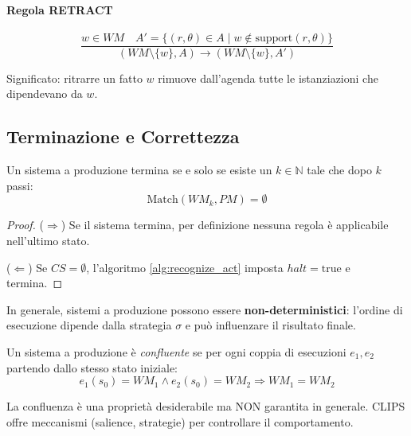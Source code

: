 \paragraph{Regola RETRACT}

\begin{equation}
\frac{
  w \in WM \quad A' = \{(r, \theta) \in A \mid w \notin \text{support}(r, \theta)\}
}{
  (WM \setminus \{w\}, A) \to (WM \setminus \{w\}, A')
}
\end{equation}

Significato: ritrarre un fatto $w$ rimuove dall'agenda tutte le istanziazioni che dipendevano da $w$.

\subsection{Terminazione e Correttezza}

\begin{teorema}[Terminazione]
Un sistema a produzione termina se e solo se esiste un $k \in \mathbb{N}$ tale che dopo $k$ passi:
\begin{equation}
\text{Match}(WM_k, PM) = \emptyset
\end{equation}
\end{teorema}

\begin{proof}
($\Rightarrow$) Se il sistema termina, per definizione nessuna regola è applicabile nell'ultimo stato.

($\Leftarrow$) Se $CS = \emptyset$, l'algoritmo \ref{alg:recognize_act} imposta $halt = \text{true}$ e termina.
\end{proof}

\begin{warningbox}
In generale, sistemi a produzione possono essere \textbf{non-deterministici}: l'ordine di esecuzione dipende dalla strategia $\sigma$ e può influenzare il risultato finale.
\end{warningbox}

\begin{teorema}[Confluenza]
Un sistema a produzione è \textit{confluente} se per ogni coppia di esecuzioni $e_1, e_2$ partendo dallo stesso stato iniziale:
\begin{equation}
e_1(s_0) = WM_1 \land e_2(s_0) = WM_2 \Rightarrow WM_1 = WM_2
\end{equation}
\end{teorema}

\begin{osservazione}
La confluenza è una proprietà desiderabile ma NON garantita in generale. CLIPS offre meccanismi (salience, strategie) per controllare il comportamento.
\end{osservazione}

